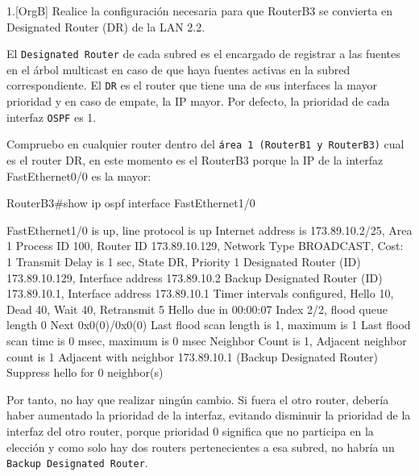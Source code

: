\begin{ejer}
1.[OrgB] Realice la configuración necesaria para que RouterB3 se convierta
en Designated Router (DR) de la LAN 2.2.
\end{ejer}
\par El \texttt{Designated Router} de cada subred es el encargado de registrar a las fuentes en el árbol multicast en caso de que haya fuentes activas en la subred correspondiente. El \texttt{DR} es el router que tiene una de sus interfaces la mayor prioridad y en caso de empate, la IP mayor. Por defecto, la prioridad de cada interfaz \texttt{OSPF} es 1.
\par Compruebo en cualquier router dentro del \texttt{área 1 (RouterB1 y RouterB3)} cual es el router DR, en este momento es el RouterB3 porque la IP de la interfaz FastEthernet0/0 es la mayor:
\begin{listing}[style=consola]
RouterB3#show ip ospf interface FastEthernet1/0

FastEthernet1/0 is up, line protocol is up
  Internet address is 173.89.10.2/25, Area 1
  Process ID 100, Router ID 173.89.10.129, Network Type BROADCAST, Cost: 1
  Transmit Delay is 1 sec, State DR, Priority 1
  Designated Router (ID) 173.89.10.129, Interface address 173.89.10.2
  Backup Designated Router (ID) 173.89.10.1, Interface address 173.89.10.1
  Timer intervals configured, Hello 10, Dead 40, Wait 40, Retransmit 5
    Hello due in 00:00:07
  Index 2/2, flood queue length 0
  Next 0x0(0)/0x0(0)
  Last flood scan length is 1, maximum is 1
  Last flood scan time is 0 msec, maximum is 0 msec
  Neighbor Count is 1, Adjacent neighbor count is 1
    Adjacent with neighbor 173.89.10.1  (Backup Designated Router)
  Suppress hello for 0 neighbor(s)
\end{listing}
\par Por tanto, no hay que realizar ningún cambio. Si fuera el otro router, debería haber aumentado la prioridad de la interfaz, evitando disminuir la prioridad de la interfaz del otro router, porque prioridad 0 significa que no participa en la elección y como solo hay dos routers pertenecientes a esa subred, no habría un \texttt{Backup Designated Router}.



